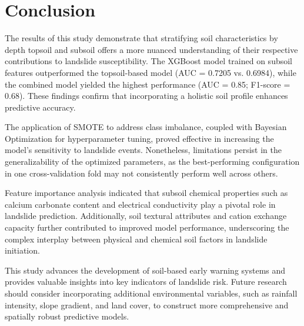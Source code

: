 \section{Conclusion}

The results of this study demonstrate that stratifying soil characteristics by depth topsoil and subsoil offers a more nuanced understanding of their respective contributions to landslide susceptibility. The XGBoost model trained on subsoil features outperformed the topsoil-based model (AUC = 0.7205 vs. 0.6984), while the combined model yielded the highest performance (AUC = 0.85; F1-score = 0.68). These findings confirm that incorporating a holistic soil profile enhances predictive accuracy.

The application of SMOTE to address class imbalance, coupled with Bayesian Optimization for hyperparameter tuning, proved effective in increasing the model’s sensitivity to landslide events. Nonetheless, limitations persist in the generalizability of the optimized parameters, as the best-performing configuration in one cross-validation fold may not consistently perform well across others.

Feature importance analysis indicated that subsoil chemical properties such as calcium carbonate content and electrical conductivity play a pivotal role in landslide prediction. Additionally, soil textural attributes and cation exchange capacity further contributed to improved model performance, underscoring the complex interplay between physical and chemical soil factors in landslide initiation.

This study advances the development of soil-based early warning systems and provides valuable insights into key indicators of landslide risk. Future research should consider incorporating additional environmental variables, such as rainfall intensity, slope gradient, and land cover, to construct more comprehensive and spatially robust predictive models.
